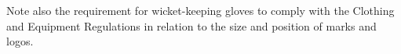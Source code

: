 \documentclass[12pt]{article}
\begin{document}
\vspace{\baselineskip}

\vspace{\baselineskip}

\vspace{\baselineskip}

\vspace{\baselineskip}

\vspace{\baselineskip}

\vspace{\baselineskip}

\vspace{\baselineskip}

\vspace{\baselineskip}
\begin{adjustwidth}{0.4in}{0.12in}
{\fontsize{9pt}{10.8pt} \tabto{0.39in} Note also the requirement for wicket-keeping gloves to comply with the Clothing and Equipment Regulations in relation to the size and position of marks and logos.\par}\par

\end{adjustwidth}


\vspace{\baselineskip}

\vspace{\baselineskip}

\vspace{\baselineskip}

\vspace{\baselineskip}

\vspace{\baselineskip}

\vspace{\baselineskip}

\vspace{\baselineskip}

\vspace{\baselineskip}

\vspace{\baselineskip}

\vspace{\baselineskip}

\vspace{\baselineskip}

\vspace{\baselineskip}

\vspace{\baselineskip}
\end{document}
